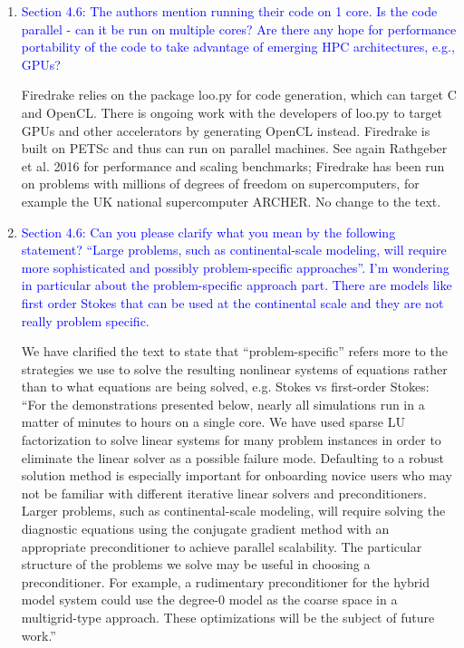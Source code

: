 \documentclass{article}
\theoremstyle{definition}
\theoremstyle{plain}
\begin{document}
\begin{enumerate}
\item \textcolor{blue}{Section 4.6: The authors mention running their code on 1 core. Is the code parallel - can it be run
on multiple cores? Are there any hope for performance portability of the code to take advantage of
emerging HPC architectures, e.g., GPUs?}

Firedrake relies on the package loo.py for code generation, which can target C and OpenCL.
There is ongoing work with the developers of loo.py to target GPUs and other accelerators by generating OpenCL instead.
Firedrake is built on PETSc and thus can run on parallel machines.
See again Rathgeber et al. 2016 for performance and scaling benchmarks; Firedrake has been run on problems with millions of degrees of freedom on supercomputers, for example the UK national supercomputer ARCHER.
No change to the text.

\item \textcolor{blue}{Section 4.6: Can you please clarify what you mean by the following statement? ``Large problems,
such as continental-scale modeling, will require more sophisticated and possibly problem-specific
approaches''. I'm wondering in particular about the problem-specific approach part. There are
models like first order Stokes that can be used at the continental scale and they are not really
problem specific.}

We have clarified the text to state that ``problem-specific'' refers more to the strategies we use to solve the resulting nonlinear systems of equations rather than to what equations are being solved, e.g. Stokes vs first-order Stokes:
``For the demonstrations presented below, nearly all simulations run in a matter of minutes to hours on a single core.
We have used sparse LU factorization to solve linear systems for many problem instances in order to eliminate the linear solver as a possible failure mode.
Defaulting to a robust solution method is especially important for onboarding novice users who may not be familiar with different iterative linear solvers and preconditioners.
Larger problems, such as continental-scale modeling, will require solving the diagnostic equations using the conjugate gradient method with an appropriate preconditioner to achieve parallel scalability.
The particular structure of the problems we solve may be useful in choosing a preconditioner.
For example, a rudimentary preconditioner for the hybrid model system could use the degree-0 model as the coarse space in a multigrid-type approach.
These optimizations will be the subject of future work.''


\end{enumerate}
\end{document}
